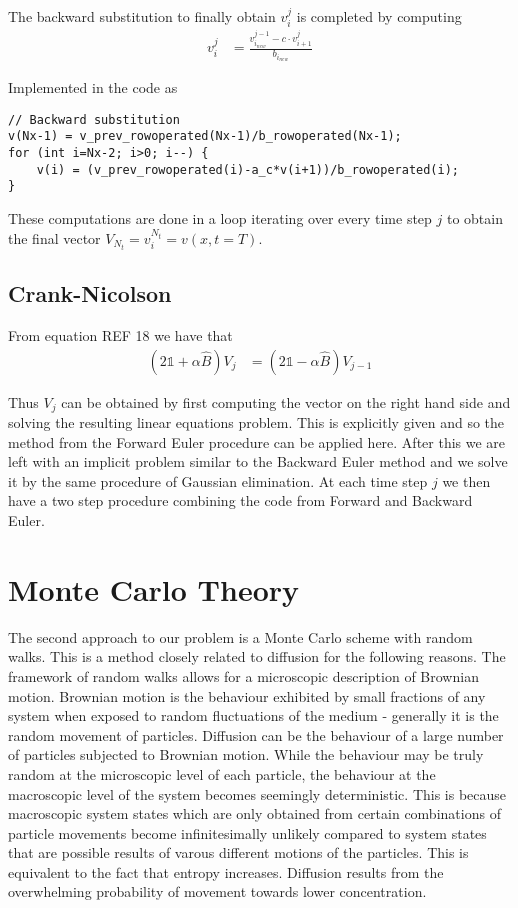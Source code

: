 \documentclass[norsk,a4paper,11pt]{article}
\begin{document}
The backward substitution to finally obtain $v_i^{j}$ is completed by computing
\begin{align}
    v_{i}^{j} & = \frac{v_{i_{new}}^{j-1} - c\cdot v_{i+1}^{j}}{b_{i_{new}}}
\end{align} 

Implemented in the code as
\begin{lstlisting}
// Backward substitution
v(Nx-1) = v_prev_rowoperated(Nx-1)/b_rowoperated(Nx-1);
for (int i=Nx-2; i>0; i--) {
    v(i) = (v_prev_rowoperated(i)-a_c*v(i+1))/b_rowoperated(i);
}           
\end{lstlisting}

These computations are done in a loop iterating over every time step $j$
to obtain the final vector $V_{N_t} = v_{i}^{N_t} = v(x, t=T)$.

\subsection{Crank-Nicolson}
From equation REF 18 we have that
\begin{align}
    (2\mathbb{1}+\alpha\hat{B})V_j &= (2\mathbb{1}-\alpha\hat{B})V_{j-1}
\end{align}

Thus $V_j$ can be obtained by first computing the vector on the right hand
side and solving the resulting linear equations problem.
This is explicitly given and so the method from the Forward Euler
procedure can be applied here. After this we are left with an implicit problem
similar to the Backward Euler method and we solve it by the same procedure
of Gaussian elimination. At each time step $j$ we then have a two step
procedure combining the code from Forward and Backward Euler.


\section{Monte Carlo Theory}
The second approach to our problem is a Monte Carlo scheme with random walks. This is a method closely related to diffusion
for the following reasons.
The framework of random
walks allows for a microscopic description of Brownian motion. 
Brownian motion is the behaviour exhibited by small fractions of any system when exposed to random fluctuations of the
medium - generally it is the random movement of particles. Diffusion can be the behaviour of a large number of particles
subjected to Brownian motion. 
While the behaviour may be truly random at the microscopic level of each particle, the behaviour at the macroscopic level of the system
becomes seemingly deterministic. This is because macroscopic system states which are only obtained from certain combinations of particle movements
become infinitesimally unlikely compared to system states that are possible results of varous different motions of the particles.
This is equivalent to the fact that entropy increases. Diffusion results from the overwhelming probability of
movement towards lower concentration. 
\end{document}
